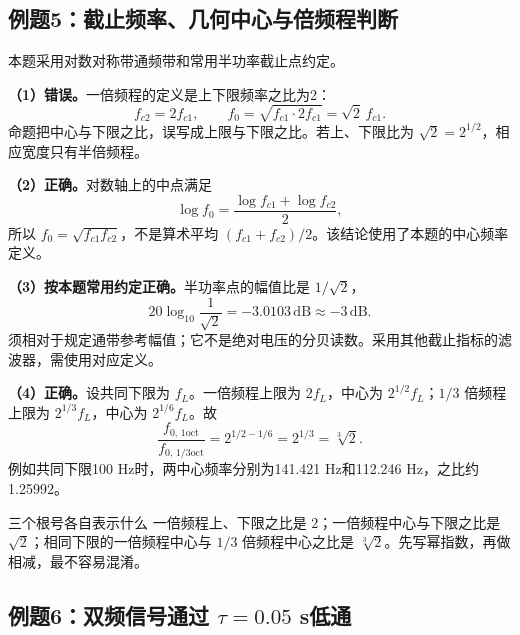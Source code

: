 \clearpage
\subsection{例题5：截止频率、几何中心与倍频程判断}


\sol
本题采用对数对称带通频带和常用半功率截止点约定。

\textbf{（1）错误。}一倍频程的定义是上下限频率之比为2：
\[
\boxed{f_{c2}=2f_{c1}},\qquad
f_0=\sqrt{f_{c1}\cdot2f_{c1}}=\sqrt2\,f_{c1}.
\]
命题把中心与下限之比，误写成上限与下限之比。若上、下限比为 $\sqrt2=2^{1/2}$，相应宽度只有半倍频程。

\textbf{（2）正确。}对数轴上的中点满足
\[
\log f_0=\frac{\log f_{c1}+\log f_{c2}}2,
\]
所以 $f_0=\sqrt{f_{c1}f_{c2}}$，不是算术平均 $(f_{c1}+f_{c2})/2$。该结论使用了本题的中心频率定义。

\textbf{（3）按本题常用约定正确。}半功率点的幅值比是 $1/\sqrt2$，
\[
20\log_{10}\frac{1}{\sqrt2}=-3.0103\,\mathrm{dB}\approx-3\,\mathrm{dB}.
\]
须相对于规定通带参考幅值；它不是绝对电压的分贝读数。采用其他截止指标的滤波器，需使用对应定义。

\textbf{（4）正确。}设共同下限为 $f_L$。一倍频程上限为 $2f_L$，中心为 $2^{1/2}f_L$；$1/3$ 倍频程上限为 $2^{1/3}f_L$，中心为 $2^{1/6}f_L$。故
\[
\boxed{\frac{f_{0,\,1\mathrm{oct}}}{f_{0,\,1/3\mathrm{oct}}}
=2^{1/2-1/6}=2^{1/3}=\sqrt[3]2}.
\]
例如共同下限100 Hz时，两中心频率分别为141.421 Hz和112.246 Hz，之比约1.25992。

\begin{focusbox}{三个根号各自表示什么}
一倍频程上、下限之比是 $2$；一倍频程中心与下限之比是 $\sqrt2$；相同下限的一倍频程中心与 $1/3$ 倍频程中心之比是 $\sqrt[3]2$。先写幂指数，再做相减，最不容易混淆。
\end{focusbox}

\clearpage
\subsection{\texorpdfstring{例题6：双频信号通过 $\tau=0.05$ s低通}{例题6：双频信号通过时间常数0.05 s的低通}}

